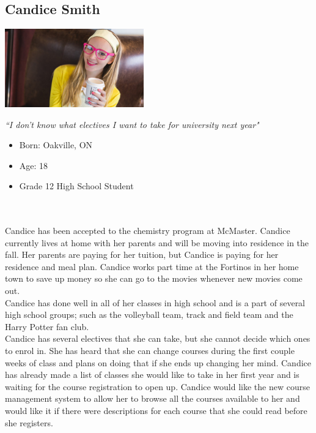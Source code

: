 \documentclass[10pt]{article}
\begin{document}
\subsection*{Candice Smith}

\begin{minipage}{60mm}
\includegraphics[width=60mm]{Candice.jpg}
\begin{center}
\emph{``I don't know what electives I want to take for university next year"}
\end{center}
\end{minipage} \hfill
\begin{minipage}{\textwidth}
\begin{itemize}
\item Born: Oakville, ON
\item Age: 18
\item Grade 12 High School Student
\end{itemize}
\end{minipage}\\\\


Candice has been accepted to the chemistry program at McMaster. Candice currently lives at home with her parents and will be moving into residence in the fall. Her parents are paying for her tuition, but Candice is paying for her residence and meal plan. Candice works part time at the Fortinos in her home town to save up money so she can go to the movies whenever new movies come out.\\

Candice has done well in all of her classes in high school and is a part of several high school groups; such as the volleyball team, track and field team and the Harry Potter fan club.\\

Candice has several electives that she can take, but she cannot decide which ones to enrol in. She has heard that she can change courses during the first couple weeks of class and plans on doing that if she ends up changing her mind. Candice has already made a list of classes she would like to take in her first year and is waiting for the course registration to open up. Candice would like the new course management system to allow her to browse all the courses available to her and would like it if there were descriptions for each course that she could read before she registers.
\end{document}
